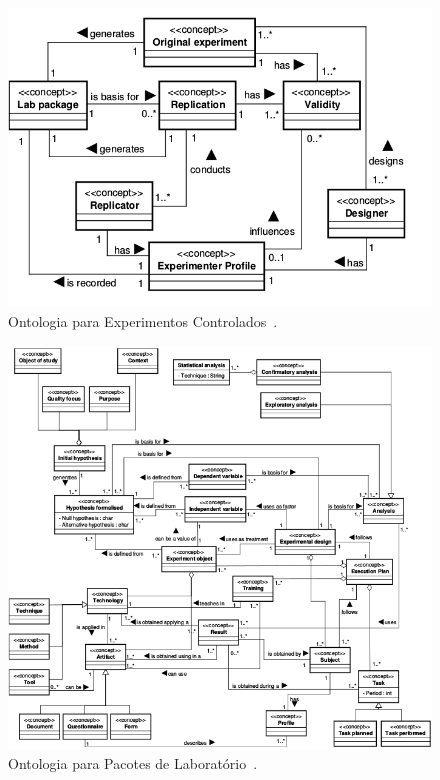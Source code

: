 \documentclass[aspectratio=169]{beamer}
\begin{document}
\begin{frame}
\justifying

\begin{figure}
\centering
\includegraphics[scale=0.4]{images/controlados.png}
\caption{Ontologia para Experimentos Controlados~\cite{Garcia08}.}
\label{image:controlados}
\end{figure}


\end{frame}

\begin{frame}
\justifying

\begin{figure}
\centering
\includegraphics[scale=0.33]{images/onto.png}
\caption{Ontologia para Pacotes de Laboratório~\cite{Garcia08}.}
\label{image:ontolgia}
\end{figure}

\end{frame}
\end{document}
